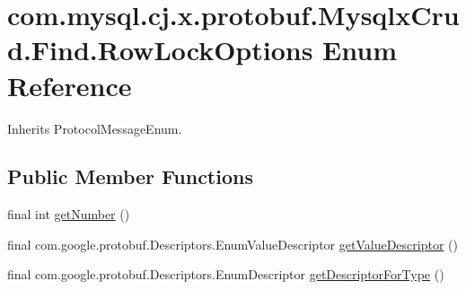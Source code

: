 \hypertarget{enumcom_1_1mysql_1_1cj_1_1x_1_1protobuf_1_1_mysqlx_crud_1_1_find_1_1_row_lock_options}{}\section{com.\+mysql.\+cj.\+x.\+protobuf.\+Mysqlx\+Crud.\+Find.\+Row\+Lock\+Options Enum Reference}
\label{enumcom_1_1mysql_1_1cj_1_1x_1_1protobuf_1_1_mysqlx_crud_1_1_find_1_1_row_lock_options}


Inherits Protocol\+Message\+Enum.

\subsection*{Public Member Functions}
\begin{DoxyCompactItemize}
\item 
final int \mbox{\hyperlink{enumcom_1_1mysql_1_1cj_1_1x_1_1protobuf_1_1_mysqlx_crud_1_1_find_1_1_row_lock_options_a91a232f7f94808831b2e88f984244bc1}{get\+Number}} ()
\item 
final com.\+google.\+protobuf.\+Descriptors.\+Enum\+Value\+Descriptor \mbox{\hyperlink{enumcom_1_1mysql_1_1cj_1_1x_1_1protobuf_1_1_mysqlx_crud_1_1_find_1_1_row_lock_options_a98c457892d7abc0f72f79f082f80dd77}{get\+Value\+Descriptor}} ()
\item 
final com.\+google.\+protobuf.\+Descriptors.\+Enum\+Descriptor \mbox{\hyperlink{enumcom_1_1mysql_1_1cj_1_1x_1_1protobuf_1_1_mysqlx_crud_1_1_find_1_1_row_lock_options_a840cac2b6342604367d5e563b2003d05}{get\+Descriptor\+For\+Type}} ()
\end{DoxyCompactItemize}
